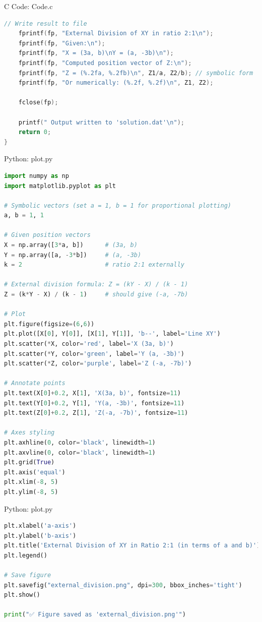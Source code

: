 \documentclass{beamer}
\numberwithin{equation}{section}
\theoremstyle{remark}
\begin{document}
\begin{frame}[fragile]{C Code: Code.c}
\begin{lstlisting}[language=C]
    // Write result to file
    fprintf(fp, "External Division of XY in ratio 2:1\n");
    fprintf(fp, "Given:\n");
    fprintf(fp, "X = (3a, b)\nY = (a, -3b)\n");
    fprintf(fp, "Computed position vector of Z:\n");
    fprintf(fp, "Z = (%.2fa, %.2fb)\n", Z1/a, Z2/b); // symbolic form
    fprintf(fp, "Or numerically: (%.2f, %.2f)\n", Z1, Z2);

    fclose(fp);

    printf(" Output written to 'solution.dat'\n");
    return 0;
}


    \end{lstlisting}
\end{frame}
\begin{frame}[fragile]{Python: plot.py}
\begin{lstlisting}[language=Python]
  import numpy as np
import matplotlib.pyplot as plt

# Symbolic vectors (set a = 1, b = 1 for proportional plotting)
a, b = 1, 1

# Given position vectors
X = np.array([3*a, b])      # (3a, b)
Y = np.array([a, -3*b])     # (a, -3b)
k = 2                       # ratio 2:1 externally

# External division formula: Z = (kY - X) / (k - 1)
Z = (k*Y - X) / (k - 1)     # should give (-a, -7b)

# Plot
plt.figure(figsize=(6,6))
plt.plot([X[0], Y[0]], [X[1], Y[1]], 'b--', label='Line XY')
plt.scatter(*X, color='red', label='X (3a, b)')
plt.scatter(*Y, color='green', label='Y (a, -3b)')
plt.scatter(*Z, color='purple', label='Z (-a, -7b)')

# Annotate points
plt.text(X[0]+0.2, X[1], 'X(3a, b)', fontsize=11)
plt.text(Y[0]+0.2, Y[1], 'Y(a, -3b)', fontsize=11)
plt.text(Z[0]+0.2, Z[1], 'Z(-a, -7b)', fontsize=11)

# Axes styling
plt.axhline(0, color='black', linewidth=1)
plt.axvline(0, color='black', linewidth=1)
plt.grid(True)
plt.axis('equal')
plt.xlim(-8, 5)
plt.ylim(-8, 5)
\end{lstlisting}
\end{frame}
\begin{frame}[fragile]{Python: plot.py}
\begin{lstlisting}[language=Python]
plt.xlabel('a-axis')
plt.ylabel('b-axis')
plt.title('External Division of XY in Ratio 2:1 (in terms of a and b)')
plt.legend()

# Save figure
plt.savefig("external_division.png", dpi=300, bbox_inches='tight')
plt.show()

print("✅ Figure saved as 'external_division.png'")

\end{lstlisting}
\end{frame}
\end{document}
